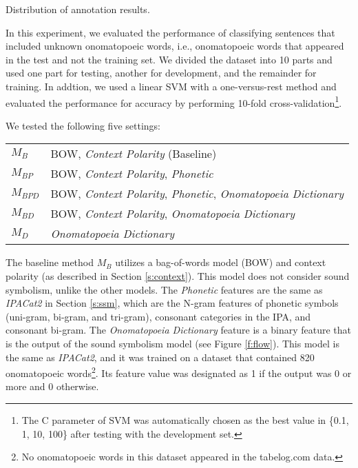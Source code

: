 \documentclass[english]{jnlp_1.4}
\begin{document}
\begin{table}[t]
\caption{Distribution of annotation results.}
\label{t:anotate}

\end{table}

In this experiment, we evaluated the performance of classifying sentences that included unknown onomatopoeic words, i.e.,
onomatopoeic words that appeared in the test and not the training set.
We divided the dataset into 10 parts and used one part for testing, another for development, and the remainder for training.
In addtion, we used a linear SVM with a one-versus-rest method and evaluated the performance for accuracy by performing 10-fold
cross-validation\footnote{The C parameter of SVM was automatically chosen as the best value in \{0.1, 1, 10, 100\} after testing with the development set.}.

We tested the following five settings:
\vspace{1\Cvs}

\begin{tabular}{ll}
$M_B$ & BOW, {\it Context Polarity} (Baseline) \\
$M_\mathit{BP}$ & BOW, {\it Context Polarity}, {\it Phonetic} \\
$M_\mathit{BPD}$ & BOW, {\it Context Polarity}, {\it Phonetic}, {\it Onomatopoeia Dictionary} \\
$M_\mathit{BD}$ & BOW, {\it Context Polarity}, {\it Onomatopoeia Dictionary} \\
$M_{D}$ & {\it Onomatopoeia Dictionary} \\
\end{tabular}
\vspace{1\Cvs}

The baseline method $M_B$ utilizes a bag-of-words model (BOW) and context polarity (as described in Section \ref{s:context}).
This model does not consider sound symbolism, unlike the other models.
The {\it Phonetic} features are the same as {\it IPACat2} in Section \ref{s:ssm},
which are the N-gram features of phonetic symbols (uni-gram, bi-gram, and tri-gram), consonant categories in the IPA, and consonant bi-gram.
The {\it Onomatopoeia Dictionary} feature is a binary feature that is the output of the sound symbolism model (see Figure \ref{f:flow}).
This model is the same as {\it IPACat2}, and it was trained on a dataset that contained 820 onomatopoeic words\footnote{No onomatopoeic words in this dataset appeared in the tabelog.com data.}.
Its feature value was designated as 1 if the output was 0 or more and 0 otherwise.
\end{document}
